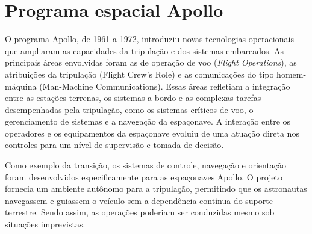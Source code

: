 


\section{Programa espacial Apollo}

O programa Apollo, de 1961 a 1972, introduziu novas tecnologias operacionais que ampliaram as capacidades da tripulação e dos sistemas embarcados.
As principais áreas envolvidas foram as de operação de voo (\emph{Flight Operations}), as atribuições da tripulação (Flight Crew's Role) e as comunicações do tipo homem-máquina (Man-Machine Communications).
Essas áreas refletiam a integração entre as estações terrenas, os sistemas a bordo e as complexas tarefas desempenhadas pela tripulação, como os sistemas críticos de voo, o gerenciamento de sistemas e a navegação da espaçonave.
A interação entre os operadores e os equipamentos da espaçonave evoluiu de uma atuação direta nos controles para um nível de supervisão e tomada de decisão.

Como exemplo da transição, os sistemas de controle, navegação e orientação foram desenvolvidos especificamente para as espaçonaves Apollo. O projeto fornecia um ambiente autônomo para a tripulação, permitindo que os astronautas navegassem e guiassem o veículo sem a dependência contínua do suporte terrestre.
Sendo assim, as operações poderiam ser conduzidas mesmo sob situações imprevistas.

